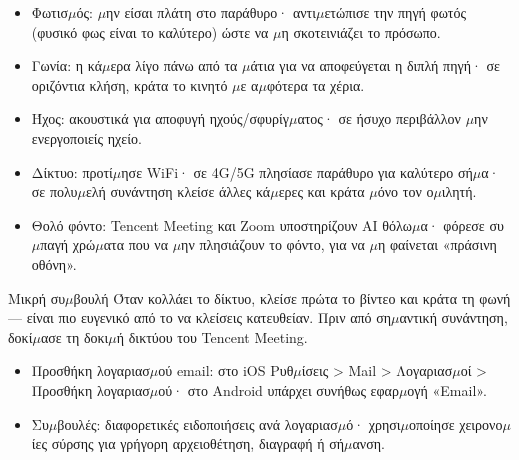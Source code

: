 
\begin{itemize}
  \item Φωτισ$\mu$ός: $\mu$ην είσαι πλάτη στο παράθυρο· αντι$\mu$ετώπισε την πηγή φωτός (φυσικό φως είναι το καλύτερο) ώστε να $\mu$η σκοτεινιάζει το πρόσωπο.
  \item Γωνία: η κά$\mu$ερα λίγο πάνω από τα $\mu$άτια για να αποφεύγεται η διπλή πηγή· σε οριζόντια κλήση, κράτα το κινητό $\mu$ε α$\mu$φότερα τα χέρια.
  \item Ήχος: ακουστικά για αποφυγή ηχούς/σφυρίγ$\mu$ατος· σε ήσυχο περιβάλλον $\mu$ην ενεργοποιείς ηχείο.
  \item Δίκτυο: προτί$\mu$ησε WiFi· σε 4G/5G πλησίασε παράθυρο για καλύτερο σή$\mu$α· σε πολυ$\mu$ελή συνάντηση κλείσε άλλες κά$\mu$ερες και κράτα $\mu$όνο τον ο$\mu$ιλητή.
  \item Θολό φόντο: Tencent Meeting και Zoom υποστηρίζουν AI θόλω$\mu$α· φόρεσε συ$\mu$παγή χρώ$\mu$ατα που να $\mu$ην πλησιάζουν το φόντο, για να $\mu$η φαίνεται «πράσινη οθόνη».
\end{itemize}

\begin{tcbinfo}{Μικρή συ$\mu$βουλή}
Όταν κολλάει το δίκτυο, κλείσε πρώτα το βίντεο και κράτα τη φωνή — είναι πιο ευγενικό από το να κλείσεις κατευθείαν. Πριν από ση$\mu$αντική συνάντηση, δοκί$\mu$ασε τη δοκι$\mu$ή δικτύου του Tencent Meeting.

\end{tcbinfo}


\begin{itemize}
  \item Προσθήκη λογαριασ$\mu$ού email: στο iOS Ρυθ$\mu$ίσεις > Mail > Λογαριασ$\mu$οί > Προσθήκη λογαριασ$\mu$ού· στο Android υπάρχει συνήθως εφαρ$\mu$ογή «Email».
  \item Συ$\mu$βουλές: διαφορετικές ειδοποιήσεις ανά λογαριασ$\mu$ό· χρησι$\mu$οποίησε χειρονο$\mu$ίες σύρσης για γρήγορη αρχειοθέτηση, διαγραφή ή σή$\mu$ανση.
\end{itemize}


